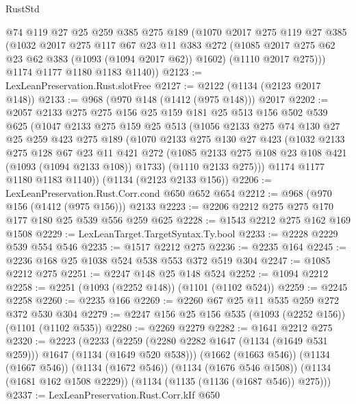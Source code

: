 \begin{lexlean}{RustStd}
\begin{coremodule}
{\begin{coremodule}
{{{{{{{        @74
        @119
        @27
        @25
        @259
        @385
        @275
        @189
        (@1070
          @2017
          @275
          @119
          @27
          @385
          (@1032
            @2017
            @275
            @117
            @67
            @23
            @11
            @383
            @272
            (@1085 @2017 @275 @62 @23 @62 @383 (@1093 (@1094 @2017 @62)) @1602)
            (@1110 @2017 @275)))
        @1174
        @1177
        @1180
        @1183
        @1140))
@2123 := LexLeanPreservation.Rust.slotFree
@2127 := @2122 (@1134 (@2123 @2017 @148))
@2133 := @968 (@970 @148 (@1412 (@975 @148))) @2017
@2202 := @2057
    @2133
    @275
    @275
    @156
    @25
    @159
    @181
    @25
    @513
    @156
    @502
    @539
    @625
    (@1047
      @2133
      @275
      @159
      @25
      @513
      (@1056
        @2133
        @275
        @74
        @130
        @27
        @25
        @259
        @423
        @275
        @189
        (@1070
          @2133
          @275
          @130
          @27
          @423
          (@1032
            @2133
            @275
            @128
            @67
            @23
            @11
            @421
            @272
            (@1085 @2133 @275 @108 @23 @108 @421 (@1093 (@1094 @2133 @108)) @1733)
            (@1110 @2133 @275)))
        @1174
        @1177
        @1180
        @1183
        @1140))
    (@1134 (@2123 @2133 @156))
@2206 := LexLeanPreservation.Rust.Corr.cond @650 @652 @654
@2212 := @968 (@970 @156 (@1412 (@975 @156))) @2133
@2223 := @2206 @2212 @275 @275 @170 @177 @180 @25 @539 @556 @259 @625
@2228 := @1543 @2212 @275 @162 @169 @1508
@2229 := LexLeanTarget.TargetSyntax.Ty.bool
@2233 := @2228 @2229 @539 @554 @546
@2235 := @1517 @2212 @275
@2236 := @2235 @164
@2245 := @2236 @168 @25 @1038 @524 @538 @553 @372 @519 @304
@2247 := @1085 @2212 @275
@2251 := @2247 @148 @25 @148 @524
@2252 := @1094 @2212
@2258 := @2251 (@1093 (@2252 @148)) (@1101 (@1102 @524))
@2259 := @2245 @2258
@2260 := @2235 @166
@2269 := @2260 @67 @25 @11 @535 @259 @272 @372 @530 @304
@2279 := @2247 @156 @25 @156 @535 (@1093 (@2252 @156)) (@1101 (@1102 @535))
@2280 := @2269 @2279
@2282 := @1641 @2212 @275
@2320 := @2223
    (@2233
      (@2259 (@2280 @2282 @1647 (@1134 (@1649 @531 @259))) @1647 (@1134 (@1649 @520 @538)))
      (@1662 (@1663 @546))
      (@1134 (@1667 @546))
      (@1134 (@1672 @546))
      (@1134 (@1676 @546 @1508))
      (@1134 (@1681 @162 @1508 @2229))
      (@1134 (@1135 (@1136 (@1687 @546)) @275)))
@2337 := LexLeanPreservation.Rust.Corr.kIf
    @650
}}}}}}}
\end{coremodule}}
\end{coremodule}
\end{lexlean}
